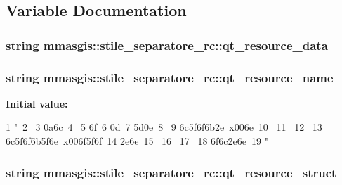 \subsection{Variable Documentation}
\hypertarget{namespacemmasgis_1_1stile__separatore__rc_a970e890fe7f6d75826e1feae42c27da3}{
\subsubsection[{qt\_\-resource\_\-data}]{\setlength{\rightskip}{0pt plus 5cm}string {\bf mmasgis::stile\_\-separatore\_\-rc::qt\_\-resource\_\-data}}}
\label{namespacemmasgis_1_1stile__separatore__rc_a970e890fe7f6d75826e1feae42c27da3}
\hypertarget{namespacemmasgis_1_1stile__separatore__rc_add0636e8e3b35cb13edc2c0daa3e13a5}{
\subsubsection[{qt\_\-resource\_\-name}]{\setlength{\rightskip}{0pt plus 5cm}string {\bf mmasgis::stile\_\-separatore\_\-rc::qt\_\-resource\_\-name}}}
\label{namespacemmasgis_1_1stile__separatore__rc_add0636e8e3b35cb13edc2c0daa3e13a5}
{\bfseries Initial value:}
\begin{DoxyCode}
1 "\
2 \
3 \x0a\x6c\
4 \
5 \x6f\
6 \x0d\
7 \x5d\x0e\
8 \
9 \x6c\x5f\x6f\x6b\x2e00\x6e\
10 \
11 \
12 \
13 \x6c\x5f\x6f\x6b\x5f\x6e00\x6f\x5f\x6f\
14 \x2e\x6e\
15 \
16 \xeb{}\
17 \
18 \x6f\x6c\x2e\x6e\
19 "
\end{DoxyCode}
\hypertarget{namespacemmasgis_1_1stile__separatore__rc_a540efb837b3eeba509fa149bc4b25787}{
\subsubsection[{qt\_\-resource\_\-struct}]{\setlength{\rightskip}{0pt plus 5cm}string {\bf mmasgis::stile\_\-separatore\_\-rc::qt\_\-resource\_\-struct}}}
